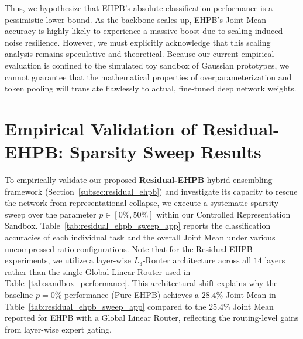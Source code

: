 \documentclass{article}
\theoremstyle{plain}
\theoremstyle{definition}
\theoremstyle{remark}
\begin{document}
Thus, we hypothesize that EHPB's absolute classification performance is a pessimistic lower bound. As the backbone scales up, EHPB's Joint Mean accuracy is highly likely to experience a massive boost due to scaling-induced noise resilience. However, we must explicitly acknowledge that this scaling analysis remains speculative and theoretical. Because our current empirical evaluation is confined to the simulated toy sandbox of Gaussian prototypes, we cannot guarantee that the mathematical properties of overparameterization and token pooling will translate flawlessly to actual, fine-tuned deep network weights.

\section{Empirical Validation of Residual-EHPB: Sparsity Sweep Results}
\label{app:residual_ehpb_sweep}

To empirically validate our proposed \textbf{Residual-EHPB} hybrid ensembling framework (Section~\ref{subsec:residual_ehpb}) and investigate its capacity to rescue the network from representational collapse, we execute a systematic sparsity sweep over the parameter $p \in [0\%, 50\%]$ within our Controlled Representation Sandbox. Table~\ref{tab:residual_ehpb_sweep_app} reports the classification accuracies of each individual task and the overall Joint Mean under various uncompressed ratio configurations. Note that for the Residual-EHPB experiments, we utilize a layer-wise $L_3$-Router architecture across all $14$ layers rather than the single Global Linear Router used in Table~\ref{tab:sandbox_performance}. This architectural shift explains why the baseline $p=0\%$ performance (Pure EHPB) achieves a $28.4\%$ Joint Mean in Table~\ref{tab:residual_ehpb_sweep_app} compared to the $25.4\%$ Joint Mean reported for EHPB with a Global Linear Router, reflecting the routing-level gains from layer-wise expert gating.
\end{document}
